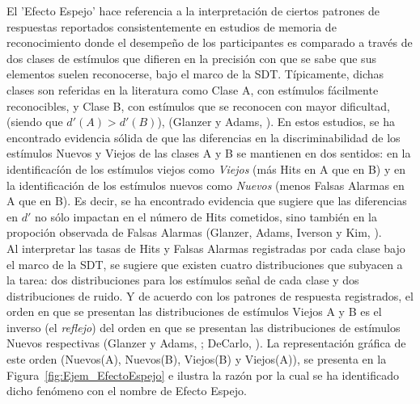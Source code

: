 El 'Efecto Espejo' hace referencia a la interpretación de ciertos patrones de respuestas reportados consistentemente en estudios de memoria de reconocimiento donde el desempeño de los participantes es comparado a través de dos clases de estímulos que difieren en la precisión con que se sabe que sus elementos suelen reconocerse, bajo el marco de la SDT. Típicamente, dichas clases son referidas en la literatura como Clase A, con estímulos fácilmente reconocibles, y Clase B, con estímulos que se reconocen con mayor dificultad, (siendo que $d'(A) > d'(B)$), (Glanzer y Adams, \citeyear{Glanzer1990}). En estos estudios, se ha encontrado evidencia sólida de que las diferencias en la discriminabilidad de los estímulos Nuevos y Viejos de las clases A y B se mantienen en dos sentidos: en la identificacíón de los estímulos viejos como \textit{Viejos} (más Hits en A que en B) y en la identificación de los estímulos nuevos como \textit{Nuevos} (menos Falsas Alarmas en A que en B). Es decir, se ha encontrado evidencia que sugiere que las diferencias en $d'$ no sólo impactan en el número de Hits cometidos, sino también en la propoción observada de Falsas Alarmas (Glanzer, Adams, Iverson y Kim, \citeyear{Glanzer1993}).\\

Al interpretar las tasas de Hits y Falsas Alarmas registradas por cada clase bajo el marco de la SDT, se sugiere que existen cuatro distribuciones que subyacen a la tarea: dos distribuciones para los estímulos señal de cada clase y dos distribuciones de ruido. Y de acuerdo con los patrones de respuesta registrados, el orden en que se presentan las distribuciones de estímulos Viejos A y B es el inverso (el \textit{reflejo}) del orden en que se presentan las distribuciones de estímulos Nuevos respectivas (Glanzer y Adams, \citeyear{Glanzer1990}; DeCarlo, \citeyear{DeCarlo2007}). La representación gráfica de este orden (Nuevos(A), Nuevos(B), Viejos(B) y Viejos(A)), se presenta en la Figura~\ref{fig:Ejem_EfectoEspejo} e ilustra la razón por la cual se ha identificado dicho fenómeno con el nombre de Efecto Espejo.\\

